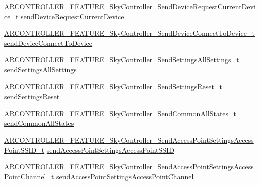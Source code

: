 \begin{DoxyCompactItemize}
\item 
\hyperlink{_a_r_c_o_n_t_r_o_l_l_e_r___feature_8h_a27b3782f4819ce9755f2f25655354b99}{A\+R\+C\+O\+N\+T\+R\+O\+L\+L\+E\+R\+\_\+\+F\+E\+A\+T\+U\+R\+E\+\_\+\+Sky\+Controller\+\_\+\+Send\+Device\+Request\+Current\+Device\+\_\+t} \hyperlink{struct_a_r_c_o_n_t_r_o_l_l_e_r___f_e_a_t_u_r_e___sky_controller__t_a78bb86c1adc519af5736df97e2e11b25}{send\+Device\+Request\+Current\+Device}
\item 
\hyperlink{_a_r_c_o_n_t_r_o_l_l_e_r___feature_8h_a0e368567c1d46eb7f910844144f9a902}{A\+R\+C\+O\+N\+T\+R\+O\+L\+L\+E\+R\+\_\+\+F\+E\+A\+T\+U\+R\+E\+\_\+\+Sky\+Controller\+\_\+\+Send\+Device\+Connect\+To\+Device\+\_\+t} \hyperlink{struct_a_r_c_o_n_t_r_o_l_l_e_r___f_e_a_t_u_r_e___sky_controller__t_a80a9a647650134f5f71b14f15dbe4775}{send\+Device\+Connect\+To\+Device}
\item 
\hyperlink{_a_r_c_o_n_t_r_o_l_l_e_r___feature_8h_aa97c217bc0883c6924a7306a06c777d4}{A\+R\+C\+O\+N\+T\+R\+O\+L\+L\+E\+R\+\_\+\+F\+E\+A\+T\+U\+R\+E\+\_\+\+Sky\+Controller\+\_\+\+Send\+Settings\+All\+Settings\+\_\+t} \hyperlink{struct_a_r_c_o_n_t_r_o_l_l_e_r___f_e_a_t_u_r_e___sky_controller__t_a4b74c46e0afebf2290363b8d7d364bef}{send\+Settings\+All\+Settings}
\item 
\hyperlink{_a_r_c_o_n_t_r_o_l_l_e_r___feature_8h_a34abaf04d689f51cc73e607dadfd93f1}{A\+R\+C\+O\+N\+T\+R\+O\+L\+L\+E\+R\+\_\+\+F\+E\+A\+T\+U\+R\+E\+\_\+\+Sky\+Controller\+\_\+\+Send\+Settings\+Reset\+\_\+t} \hyperlink{struct_a_r_c_o_n_t_r_o_l_l_e_r___f_e_a_t_u_r_e___sky_controller__t_aa15b34395cc501c66bf4b72c08e23415}{send\+Settings\+Reset}
\item 
\hyperlink{_a_r_c_o_n_t_r_o_l_l_e_r___feature_8h_ac8c58f9edd89330ceb10ab3c49e64335}{A\+R\+C\+O\+N\+T\+R\+O\+L\+L\+E\+R\+\_\+\+F\+E\+A\+T\+U\+R\+E\+\_\+\+Sky\+Controller\+\_\+\+Send\+Common\+All\+States\+\_\+t} \hyperlink{struct_a_r_c_o_n_t_r_o_l_l_e_r___f_e_a_t_u_r_e___sky_controller__t_aa8bf58541aec9ae5c4c6015be8e48378}{send\+Common\+All\+States}
\item 
\hyperlink{_a_r_c_o_n_t_r_o_l_l_e_r___feature_8h_ad0c625686828f4f454067050bc309c5d}{A\+R\+C\+O\+N\+T\+R\+O\+L\+L\+E\+R\+\_\+\+F\+E\+A\+T\+U\+R\+E\+\_\+\+Sky\+Controller\+\_\+\+Send\+Access\+Point\+Settings\+Access\+Point\+S\+S\+I\+D\+\_\+t} \hyperlink{struct_a_r_c_o_n_t_r_o_l_l_e_r___f_e_a_t_u_r_e___sky_controller__t_ab391ee10dc90a67ad1736a7a26fa11e3}{send\+Access\+Point\+Settings\+Access\+Point\+S\+S\+ID}
\item 
\hyperlink{_a_r_c_o_n_t_r_o_l_l_e_r___feature_8h_af235daab761870adfa592335ae0ed7ca}{A\+R\+C\+O\+N\+T\+R\+O\+L\+L\+E\+R\+\_\+\+F\+E\+A\+T\+U\+R\+E\+\_\+\+Sky\+Controller\+\_\+\+Send\+Access\+Point\+Settings\+Access\+Point\+Channel\+\_\+t} \hyperlink{struct_a_r_c_o_n_t_r_o_l_l_e_r___f_e_a_t_u_r_e___sky_controller__t_a4c734e17c72add7ef80f8e1a0f5b3277}{send\+Access\+Point\+Settings\+Access\+Point\+Channel}

\end{DoxyCompactItemize}
